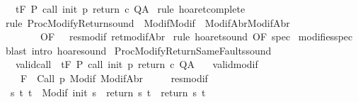 \begin{isabellebody}
\ \ \ {\isachardoublequoteopen}{\isasymGamma}{\isacharcomma}{\isasymTheta}{\isasymturnstile}\isactrlsub t\isactrlbsub {\isacharslash}F\isactrlesub \ P\ {\isacharparenleft}call\ init\ p\ return\ c{\isacharparenright}\ Q{\isacharcomma}A{\isachardoublequoteclose}\isanewline
%
\isadelimproof
%
\endisadelimproof
%
\isatagproof
{}\isamarkupfalse%
\ {\isacharparenleft}rule\ hoaret{\isacharunderscore}complete{\isacharprime}{\isacharparenright}\ \isanewline
{}\isamarkupfalse%
\ {\isacharparenleft}rule\ ProcModifyReturn{\isacharunderscore}sound\ {\isacharbrackleft}\ Modif{\isacharequal}Modif\ \ ModifAbr{\isacharequal}ModifAbr{\isacharcomma}\ \isanewline
\ \ \ \ \ \ \ \ OF\ {\isacharunderscore}\ {\isacharunderscore}\ res{\isacharunderscore}modif\ ret{\isacharunderscore}modifAbr{\isacharbrackright}{\isacharparenright}\isanewline
{}\isamarkupfalse%
\ {\isacharparenleft}rule\ hoaret{\isacharunderscore}sound\ {\isacharbrackleft}OF\ spec{\isacharbrackright}{\isacharparenright}\isanewline
{}\isamarkupfalse%
\ modifies{\isacharunderscore}spec\isanewline
{}\isamarkupfalse%
\ {\isacharparenleft}blast\ intro{\isacharcolon}\ hoare{\isacharunderscore}sound{\isacharparenright}\isanewline
{}\isamarkupfalse%
%
\endisatagproof
{\isafoldproof}%
%
\isadelimproof
\isanewline
%
\endisadelimproof
\isanewline
{}\isamarkupfalse%
\ ProcModifyReturnSameFaults{\isacharunderscore}sound{\isacharcolon}\isanewline
\ \ \ valid{\isacharunderscore}call{\isacharcolon}\ {\isachardoublequoteopen}{\isasymGamma}{\isacharcomma}{\isasymTheta}\ {\isasymTurnstile}\isactrlsub t\isactrlbsub {\isacharslash}F\isactrlesub \ P\ call\ init\ p\ return{\isacharprime}\ c\ Q{\isacharcomma}A{\isachardoublequoteclose}\isanewline
\ \ \ valid{\isacharunderscore}modif{\isacharcolon}\ \isanewline
\ \ {\isachardoublequoteopen}{\isasymforall}{\isasymsigma}{\isachardot}\ {\isasymGamma}{\isacharcomma}{\isasymTheta}\ {\isasymTurnstile}\isactrlbsub {\isacharslash}F\isactrlesub \ {\isacharbraceleft}{\isasymsigma}{\isacharbraceright}\ Call\ p\ {\isacharparenleft}Modif\ {\isasymsigma}{\isacharparenright}{\isacharcomma}{\isacharparenleft}ModifAbr\ {\isasymsigma}{\isacharparenright}{\isachardoublequoteclose}\ \isanewline
\ \ \ res{\isacharunderscore}modif{\isacharcolon}\isanewline
\ \ {\isachardoublequoteopen}{\isasymforall}s\ t{\isachardot}\ t\ {\isasymin}\ Modif\ {\isacharparenleft}init\ s{\isacharparenright}\ {\isasymlongrightarrow}\ return{\isacharprime}\ s\ t\ {\isacharequal}\ return\ s\ t{\isachardoublequoteclose}\isanewline

\end{isabellebody}
